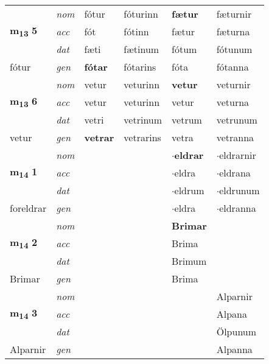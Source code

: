 \begin{longtable}[l]{llllll}
\multirow{3}{*}{{{\textbf{m{\textsubscript{13}}} \Large{\textbf{5}}}}}  & {\footnotesize{{\textit{nom}}}} & fótur & fóturinn    & \textbf{fætur} & fæturnir  \\*
 &  {\footnotesize{{\textit{acc}}}} & fót  & fótinn   & fætur  & fæturna \\*
 &  {\footnotesize{{\textit{dat}}}} & fæti & fætinum   & fótum & fótunum \\*
 {\footnotesize{fótur}} &   {\footnotesize{{\textit{gen}}}} & \textbf{fótar}  & fótarins  & fóta & fótanna \\
\cmidrule{1-6}


\multirow{3}{*}{{{\textbf{m{\textsubscript{13}}} \Large{\textbf{6}}}}}  & {\footnotesize{{\textit{nom}}}} & vetur & veturinn    & \textbf{vetur} & veturnir  \\*
 &  {\footnotesize{{\textit{acc}}}} & vetur  & veturinn   & vetur  & veturna \\*
 &  {\footnotesize{{\textit{dat}}}} & vetri & vetrinum   & vetrum & vetrunum \\*
 {\footnotesize{vetur}} &   {\footnotesize{{\textit{gen}}}} & \textbf{vetrar}  & vetrarins  & vetra & vetranna \\
\cmidrule{1-6}


\multirow{3}{*}{{{\textbf{m{\textsubscript{14}}} \Large{\textbf{1}}}}}  & {\footnotesize{{\textit{nom}}}} &  &     & \textbf{$\cdot$eldrar} & $\cdot$eldrarnir  \\*
 &  {\footnotesize{{\textit{acc}}}} &   &    & $\cdot$eldra  & $\cdot$eldrana \\*
 &  {\footnotesize{{\textit{dat}}}} &  &    & $\cdot$eldrum & $\cdot$eldrunum \\*
 {\footnotesize{foreldrar}} &   {\footnotesize{{\textit{gen}}}} & \textbf{}  &   & $\cdot$eldra & $\cdot$eldranna \\
\cmidrule{1-6}


\multirow{3}{*}{{{\textbf{m{\textsubscript{14}}} \Large{\textbf{2}}}}}  & {\footnotesize{{\textit{nom}}}} &  &     & \textbf{Brimar} &   \\*
 &  {\footnotesize{{\textit{acc}}}} &   &    & Brima  &  \\*
 &  {\footnotesize{{\textit{dat}}}} &  &    & Brimum &  \\*
 {\footnotesize{Brimar}} &   {\footnotesize{{\textit{gen}}}} & \textbf{}  &   & Brima &  \\
\cmidrule{1-6}


\multirow{3}{*}{{{\textbf{m{\textsubscript{14}}} \Large{\textbf{3}}}}}  & {\footnotesize{{\textit{nom}}}} &  &     & \textbf{} & Alparnir  \\*
 &  {\footnotesize{{\textit{acc}}}} &   &    &   & Alpana \\*
 &  {\footnotesize{{\textit{dat}}}} &  &    &  & Ölpunum \\*
 {\footnotesize{Alparnir}} &   {\footnotesize{{\textit{gen}}}} & \textbf{}  &   &  & Alpanna \\
\cmidrule{1-6}



\end{longtable}
